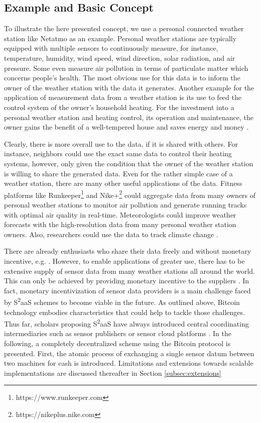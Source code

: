 \subsection{Example and Basic Concept}
To illustrate the here presented concept, we use a personal connected weather station like Netatmo \parencite{netatmo} as an example. Personal weather stations are typically equipped with multiple sensors to continuously measure, for instance, temperature, humidity, wind speed, wind direction, solar radiation, and air pressure. Some even measure air pollution in terms of particulate matter which concerns people's health. The most obvious use for this data is to inform the owner of the weather station with the data it generates. Another example for the application of measurement data from a weather station is its use to feed the control system of the owner's household heating. For the investment into a personal weather station and heating control, its operation and maintenance, the owner gains the benefit of a well-tempered house and saves energy and money \parencite{dong2014real}. 

Clearly, there is more overall use to the data, if it is shared with others. For instance, neighbors could use the exact same data to control their heating systems, however, only given the condition that the owner of the weather station is willing to share the generated data. Even for the rather simple case of a weather station, there are many other useful applications of the data. Fitness platforms like Runkeeper\footnote{https://www.runkeeper.com} and Nike+\footnote{https://nikeplus.nike.com} could aggregate data from many owners of personal weather stations to monitor air pollution and generate running tracks with optimal air quality in real-time. Meteorologists could improve weather forecasts with the high-resolution data from many personal weather station owners. Also, researchers could use the data to track climate change \parencite{JOC:JOC1276}.

There are already enthusiasts who share their data freely and without monetary incentive, e.g. \parencite{wunderground.com}. However, to enable applications of greater use, there has to be extensive supply of sensor data from many weather stations all around the world. This can only be achieved by providing monetary incentive to the suppliers \parencite{bohli2009initial}. In fact, monetary incentivization of sensor data providers is a main challenge faced by S\textsuperscript{2}aaS schemes to become viable in the future. As outlined above, Bitcoin technology embodies characteristics that could help to tackle those challenges. Thus far, scholars proposing S\textsuperscript{2}aaS have always introduced central coordinating intermediaries \parencite{bohli2009initial} such as sensor publishers \parencite{perera2014sensing} or sensor cloud platforms \parencite{sheng2013sensing}. 
In the following, a completely decentralized scheme using the Bitcoin protocol is presented. First, the atomic process of exchanging a single sensor datum between two machines for cash is introduced. Limitations and extensions towards scalable implementations are discussed thereafter in Section \ref{subsec:extensions}

